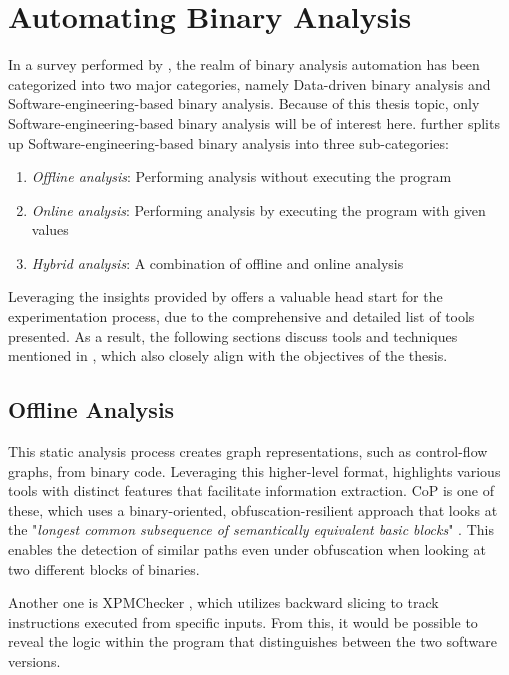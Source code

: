 \section{Automating Binary Analysis}
\label{sec:related_work:automating_binary}

In a survey performed by \textcite{automating_binary_analysis}, the realm of binary analysis automation has been categorized into two major categories, namely Data-driven binary analysis and Software-engineering-based binary analysis. Because of this thesis topic, only Software-engineering-based binary analysis will be of interest here. \textcite{automating_binary_analysis} further splits up Software-engineering-based binary analysis into three sub-categories:
\begin{enumerate}
    \item \textit{Offline analysis}: Performing analysis without executing the program
    \item \textit{Online analysis}: Performing analysis by executing the program with given values
    \item \textit{Hybrid analysis}: A combination of offline and online analysis
\end{enumerate}

Leveraging the insights provided by \textcite{automating_binary_analysis} offers a valuable head start for the experimentation process, due to the comprehensive and detailed list of tools presented. As a result, the following sections discuss tools and techniques mentioned in \cite{automating_binary_analysis}, which also closely align with the objectives of the thesis.

\subsection{Offline Analysis}
This static analysis process creates graph representations, such as control-flow graphs, from binary code. Leveraging this higher-level format, \textcite{automating_binary_analysis} highlights various tools with distinct features that facilitate information extraction. CoP \cite{CoP} is one of these, which uses a binary-oriented, obfuscation-resilient approach that looks at the "\textit{longest common subsequence of semantically equivalent basic blocks}" \cite{CoP}. This enables the detection of similar paths even under obfuscation when looking at two different blocks of binaries. 

Another one is XPMChecker \cite{XMPChecker}, which utilizes backward slicing to track instructions executed from specific inputs. From this, it would be possible to reveal the logic within the program that distinguishes between the two software versions. 

